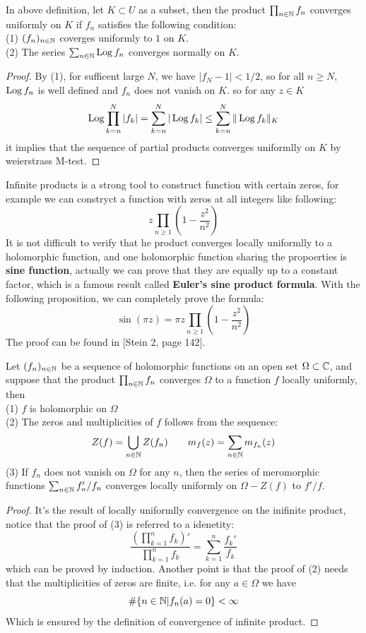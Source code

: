 \begin{lemma}
    In above definition, let \(K \subset U\) as a subset, then the product \(\prod_{n \in \mathbb{N}} f_n\) converges uniformly on \(K\) if \(f_n\) satisfies the following condition:\\
    (1) \((f_n)_{n \in \mathbb{N}}\) coverges uniformly to \(1\) on \(K\).\\
    (2) The series \(\sum_{n \in \mathbb{N}}\operatorname{Log} f_n\) converges normally on \(K\).

    \begin{proof}
        By (1), for sufficent large \(N\), we have \(|f_N - 1| < 1/2\), so for all \(n \geq N\), \(\operatorname{Log} f_n\) is well defined and  \(f_n\) does not vanish on \(K\). so for any \(z \in K\)
        \[\operatorname{Log} \prod_{k=n}^N |f_k| = \sum_{k=n}^N |\operatorname{Log} f_k| \leq \sum_{k=n}^N \|\operatorname{Log} f_k\|_{K}\]
        it implies that the sequence of partial products converges uniformlly on \(K\) by weierstrass M-test. 
    \end{proof}
\end{lemma}

Infinite products is a strong tool to construct function with certain zeros, for example we can constryct a function with zeros at all integers like following:
\[z \prod_{n \geq 1} (1 - \frac{z^2}{n^2})\]
It is not difficult to verify that he product converges locally uniformlly to a holomorphic function, and one holomorphic function sharing the propoerties is \textbf{sine function}, actually we can prove that they are equally up to a constant factor, which is a famous result called \textbf{Euler's sine product formula}. With the following proposition, we can completely prove the formula:
\[\sin(\pi z) = \pi z \prod_{n \geq 1} (1 - \frac{z^2}{n^2})\]
The proof can be found in [Stein 2, page 142].
\begin{proposition}
    Let \((f_n)_{n \in \mathbb{N}}\) be a sequence of holomorphic functions on an open set \(\Omega \subset \mathbb{C}\), and suppose that the product \(\prod_{n \in \mathbb{N}} f_n\) converges  \(\Omega\) to a function \(f\) locally uniformly, then\\
    (1) \(f\) is holomorphic on \(\Omega\)\\
    (2) The zeros and multiplicities of \(f\) follows from the sequence:
    \[Z(f) = \bigcup_{n \in \mathbb{N}} Z(f_n) \qquad m_f(z)= \sum_{n \in \mathbb{N}} m_{f_n}(z)\] 
    (3) If \(f_n\) does not vanish on \(\Omega\) for any \(n\), then the series of meromorphic functions \(\sum_{n \in \mathbb{N}} f_n'/f_n\) converges locally uniformly on \(\Omega - Z(f)\) to \(f'/f\).
\end{proposition}
\begin{proof}
    It's the result of locally uniformlly convergence on the inifinite product, notice that the proof of (3) is referred to a idenetity:
    \[\frac{(\prod_{k=1}^nf_k)'}{\prod_{k=1}^nf_k} = \sum_{k=1}^n \frac{f_k'}{f_k}\]
    which can be proved by induction. Another point is that the proof of (2) needs that the multiplicities of zeros are finite, i.e. for any \(a \in \Omega\) we have
    \[\#\{n\in \mathbb{N} | f_n(a) = 0\} < \infty\]
    Which is ensured by the definition of convergence of infinite product.
\end{proof}

